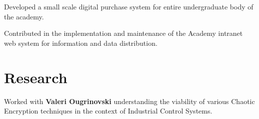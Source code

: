 \documentclass[letterpaper]{deedy-resume} %
\begin{document}
\begin{minipage}[t]{0.60\textwidth}


\vspace{\topsep} %
\begin{tightitemize}
\item Developed a small scale digital purchase system for entire undergraduate body of the academy.
\item Contributed in the implementation and maintenance of the Academy intranet web system for information and data distribution.
\end{tightitemize}

\sectionspace %



%
%
%


\section{Research}
\vspace{\topsep}

Worked with \textbf{Valeri Ougrinovski} understanding the viability of various Chaotic Encryption techniques in the context of Industrial Control Systems. 
\sectionspace %




\end{minipage}
\end{document}
